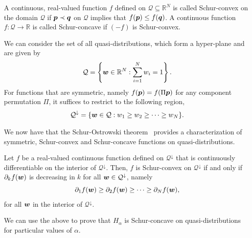 \documentclass[pra,
aps,
twocolumn,
superscriptaddress,
groupedaddress,
nofootinbib,
reprint
]{revtex4-1}
\begin{document}
\begin{definition} 
	A continuous, real-valued function $f$ defined on $\mathcal{Q} \subseteq \mathbb{R}^N$ is called Schur-convex on the domain $\mathcal{Q}$ if $\boldsymbol{p} \prec \boldsymbol{q}$ on $\mathcal{Q}$ implies that $f(\boldsymbol{p}) \le f(\boldsymbol{q})$. A continuous function $f:\mathcal{Q} \rightarrow \mathbb{R}$ is called Schur-concave if $(-f)$ is Schur-convex.
\end{definition}
We can consider the set of all quasi-distributions, which form a hyper-plane and are given by
\begin{equation}
	\mathcal{Q} = \left\{ \boldsymbol{w} \in \mathbb{R}^N: \sum_{i=1}^N w_i = 1 \right\}.
\end{equation}
For functions that are symmetric, namely $f(\boldsymbol{p}) = f(\Pi \boldsymbol{p})$ for any component permutation $\Pi$, it suffices to restrict to the following region,
\begin{equation}
	\mathcal{Q}^\downarrow = \{ \boldsymbol{w} \in \mathcal{Q} : w_1 \ge w_2 \ge \cdots \ge w_N\}.
\end{equation}

We now have that the Schur-Ostrowski theorem~\cite{cit:marshall} provides a characterization of symmetric, Schur-convex and Schur-concave functions on quasi-distributions.
\begin{lemma}
	Let $f$ be a real-valued continuous function defined on $\mathcal{Q}^\downarrow$ that is continuously differentiable on the interior of $\mathcal{Q}^\downarrow$. 
Then, $f$ is Schur-convex on $\mathcal{Q}^\downarrow$ if and only if $\partial_k f(\boldsymbol{w})$ is decreasing in $k$ for all $\boldsymbol{w} \in \mathcal{Q}^\downarrow$, namely
\begin{equation}
	\partial_1 f(\boldsymbol{w}) \ge \partial_2 f(\boldsymbol{w}) \ge \cdots \ge \partial_N f(\boldsymbol{w}),
\end{equation}
for all $\boldsymbol{w}$ in the interior of $\mathcal{Q}^\downarrow$.
\end{lemma}

We can use the above to prove that $H_\alpha$ is Schur-concave on quasi-distributions for particular values of $\alpha$.
\end{document}
